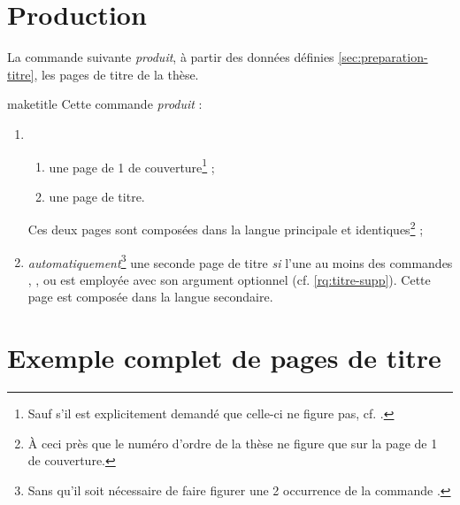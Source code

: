 \section{Production}
\label{sec:production-titre}

La commande  suivante \emph{produit}, à partir des données
définies \vref{sec:preparation-titre}, les pages de titre de la thèse.

\begin{docCommand}[doc description=\mandatory]{maketitle}{}
  Cette commande \emph{produit} :
  \begin{enumerate}
  \item
    \begin{enumerate}
    \item une page de 1\iere{} de couverture\footnote{Sauf s'il est
        explicitement demandé que celle-ci ne figure pas,
        cf. .} ;
    \item une page de titre.
    \end{enumerate}
    Ces deux pages sont composées dans la langue principale et
    identiques\footnote{À ceci près que le numéro d'ordre de la thèse ne figure
      que sur la page de 1\iere{} de couverture.} ;
  \item \emph{automatiquement}\footnote{Sans qu'il soit nécessaire de faire
      figurer une 2\ieme{} occurrence de la commande .} une
    seconde page de titre \emph{si}  l'une au moins des
    commandes , ,  ou
     est employée avec son argument optionnel
    (cf. \vref{rq:titre-supp}). Cette page est composée dans la langue
    secondaire.
  \end{enumerate}
\end{docCommand}


\section{Exemple complet de pages de titre}
\label{sec:exemple-complet}

